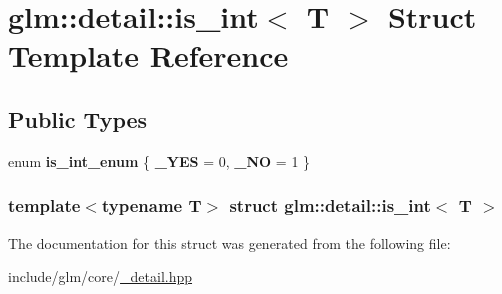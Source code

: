 \hypertarget{structglm_1_1detail_1_1is__int}{\section{glm\-:\-:detail\-:\-:is\-\_\-int$<$ \-T $>$ \-Struct \-Template \-Reference}
\label{structglm_1_1detail_1_1is__int}
}
\subsection*{\-Public \-Types}
\begin{DoxyCompactItemize}
\item 
enum {\bfseries is\-\_\-int\-\_\-enum} \{ {\bfseries \-\_\-\-Y\-E\-S} =  0, 
{\bfseries \-\_\-\-N\-O} =  1
 \}
\end{DoxyCompactItemize}
\subsubsection*{template$<$typename \-T$>$ struct glm\-::detail\-::is\-\_\-int$<$ T $>$}



\-The documentation for this struct was generated from the following file\-:\begin{DoxyCompactItemize}
\item 
include/glm/core/\hyperlink{__detail_8hpp}{\-\_\-detail.\-hpp}\end{DoxyCompactItemize}
